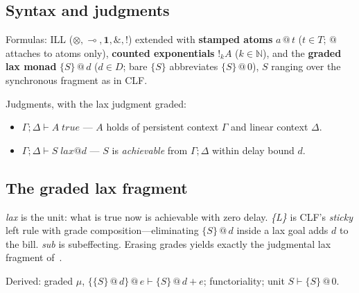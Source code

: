 \documentclass[11pt]{article}
\makeatletter
\newcommand{\lax}[2]{\{#1\}\mathbin{@}#2}       %
\newcommand{\gbang}[1]{{!}_{#1}}                 %
\newcommand{\loli}{\multimap}                    %
\newcommand{\tensor}{\otimes}                    %
\newcommand{\addconj}{\mathbin{\&}}              %
\newcommand{\bang}{{!}}                          %
\newcommand{\tr}{\;\mathit{true}}                %
\newcommand{\laxjdg}[1]{\;\mathit{lax}@{#1}}    %
\newcommand{\NN}{\mathbb{N}}                     %
\newcommand{\stmp}[2]{#1\mathbin{@}#2}           %
\theoremstyle{definition}
\theoremstyle{remark}
\makeatother
\begin{document}
\subsection{Syntax and judgments}

Formulas: ILL ($\tensor, \loli, \mathbf{1}, \addconj, \bang$) extended with
\textbf{stamped atoms} $\stmp{a}{t}$ ($t \in T$; $@$ attaches to atoms only),
\textbf{counted exponentials} $\gbang{k} A$ ($k \in \NN$), and the \textbf{graded
lax monad} $\lax{S}{d}$ ($d \in D$; bare $\{S\}$ abbreviates $\lax{S}{0}$), $S$
ranging over the synchronous fragment as in CLF.

Judgments, with the lax judgment graded:
\begin{itemize}
\item $\Gamma; \Delta \vdash A\tr$ --- $A$ holds of persistent context $\Gamma$
  and linear context $\Delta$.
\item $\Gamma; \Delta \vdash S\laxjdg{d}$ --- $S$ is \emph{achievable} from
  $\Gamma; \Delta$ within delay bound $d$.
\end{itemize}

\subsection{The graded lax fragment}


\noindent\textit{lax} is the unit: what is true now is achievable with zero
delay.  \textit{\{L\}} is CLF's \emph{sticky} left rule with grade
composition---eliminating $\lax{S}{d}$ inside a lax goal adds $d$ to the bill.
\textit{sub} is subeffecting.  Erasing grades yields exactly the judgmental lax
fragment of~\cite{PfenningDavies2001}.

\medskip
\noindent Derived: graded $\mu$, $\lax{\lax{S}{d}}{e} \vdash \lax{S}{d+e}$;
functoriality; unit $S \vdash \lax{S}{0}$.
\end{document}
